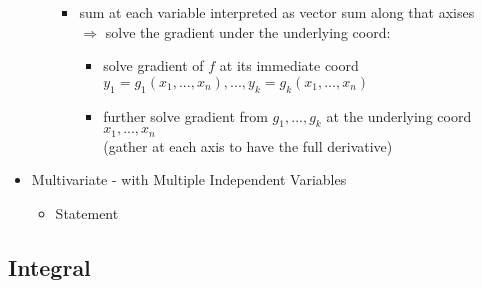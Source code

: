 \begin{itemize}
\begin{itemize}
\begin{itemize}
		\item sum at each variable interpreted as vector sum along that axises \\
		$\Rightarrow$ solve the gradient under the underlying coord:
			\begin{itemize}
			\item solve gradient of $f$ at its immediate coord $y_1=g_1(x_1,...,x_n),...,y_k=g_k(x_1,...,x_n)$
			\item further solve gradient from $g_1,...,g_k$ at the underlying coord $x_1,...,x_n$ \\
			(gather at each axis to have the full derivative)
			\end{itemize}
		\end{itemize}
	\end{itemize}
\item Multivariate - with Multiple Independent Variables
	\begin{itemize}
	\item Statement
	\end{itemize}
\end{itemize}

\subsection{Integral}
